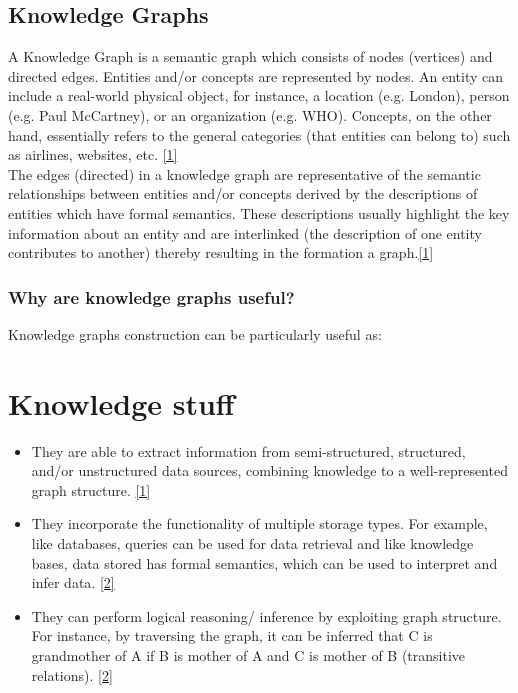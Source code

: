 \section{Knowledge Graphs}

A Knowledge Graph is a semantic graph which consists of nodes (vertices) and directed edges. Entities and/or concepts are represented by nodes. An entity can include a real-world physical object, for instance, a location (e.g. London), person (e.g. Paul McCartney), or an organization (e.g. WHO). Concepts, on the other hand, essentially refers to the general categories (that entities can belong to) such as airlines, websites, etc. \hyperlink{1}{[1]} \\

The edges (directed) in a knowledge graph are representative of the semantic relationships between entities and/or concepts derived by the descriptions of entities which have formal semantics. These descriptions usually highlight the key information about an entity and are interlinked (the description of one entity contributes to another) thereby resulting in the formation a graph.\hyperlink{1}{[1]}

\subsection{Why are knowledge graphs useful? }

Knowledge graphs construction can be particularly useful as: 
\chapter{Knowledge stuff}
\begin{itemize}
\item They are able to extract information from semi-structured, structured, and/or unstructured data sources, combining knowledge to a well-represented graph structure. \hyperlink{1}{[1]}

\item They incorporate the functionality of multiple storage types. For example, like databases, queries can be used for data retrieval and like knowledge bases, data stored has formal semantics, which can be used to interpret and infer data. \hyperlink{2}{[2]}

\item They can perform logical reasoning/ inference by exploiting graph structure. For instance, by traversing the graph, it can be inferred that C is grandmother of A if B is mother of A and C is mother of B (transitive relations). \hyperlink{2}{[2]}

\end{itemize} 

